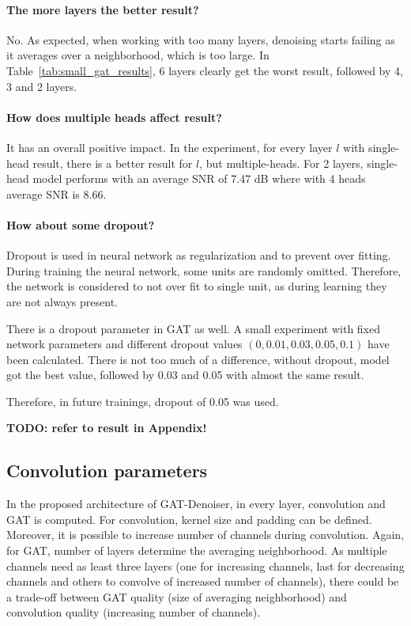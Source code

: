 \paragraph{The more layers the better result?}
No. As expected, when working with too many layers, denoising starts failing as it averages over a
neighborhood, which is too large. In Table~\ref{tab:small_gat_results}, 6 layers clearly get the worst result,
followed by 4, 3 and 2 layers.

\paragraph{How does multiple heads affect result?}
It has an overall positive impact. 
In the experiment, for every layer $l$ with single-head result, there
is a better result for $l$, but multiple-heads. 
For 2 layers, single-head model performs with an average SNR of 7.47 dB where with 4 heads average SNR is 8.66.

\paragraph{How about some dropout?}

Dropout is used in neural network as regularization and to prevent over fitting. 
During training the neural network, some units are randomly omitted. Therefore, the network is 
considered to not over fit to single unit, as during learning they are not always present.

There is a dropout parameter in GAT as well. A small experiment with fixed network parameters
and different dropout values $(0, 0.01, 0.03, 0.05, 0.1)$ have been calculated. 
There is not too much of a difference, without dropout, model got the best value, followed by 
0.03 and 0.05 with almost the same result. 

Therefore, in future trainings, dropout of 0.05 was used.

\textbf{TODO: refer to result in Appendix!}


\subsection{Convolution parameters}

In the proposed architecture of GAT-Denoiser, in every layer, convolution and GAT is computed. For convolution, kernel size and padding can be defined.
Moreover, it is possible to increase number of channels during convolution. 
Again, for GAT, number of layers determine the averaging neighborhood.
As multiple channels need as least three layers (one for increasing channels, last for decreasing channels and others to convolve of increased number of channels),
there could be a trade-off between GAT quality (size of averaging neighborhood) and convolution quality (increasing number of channels). 

